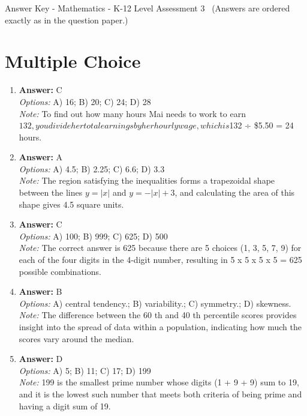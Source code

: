 \documentclass[12pt]{article}
\begin{document}
\begin{center}
Answer Key - Mathematics - K-12 Level Assessment 3 \
\small (Answers are ordered exactly as in the question paper.)
\end{center}

\section*{Multiple Choice}
\begin{enumerate}[label=\arabic*.]
\item \textbf{Answer:} C
\\ \textit{Options:} A) 16; B) 20; C) 24; D) 28
\\ \textit{Note:} To find out how many hours Mai needs to work to earn $132, you divide her total earnings by her hourly wage, which is $132 ÷ \$5.50 = 24 hours.
\item \textbf{Answer:} A
\\ \textit{Options:} A) 4.5; B) 2.25; C) 6.6; D) 3.3
\\ \textit{Note:} The region satisfying the inequalities forms a trapezoidal shape between the lines \(y = |x|\) and \(y = -|x| + 3\), and calculating the area of this shape gives 4.5 square units.
\item \textbf{Answer:} C
\\ \textit{Options:} A) 100; B) 999; C) 625; D) 500
\\ \textit{Note:} The correct answer is 625 because there are 5 choices (1, 3, 5, 7, 9) for each of the four digits in the 4-digit number, resulting in 5 x 5 x 5 x 5 = 625 possible combinations.
\item \textbf{Answer:} B
\\ \textit{Options:} A) central tendency.; B) variability.; C) symmetry.; D) skewness.
\\ \textit{Note:} The difference between the 60 th and 40 th percentile scores provides insight into the spread of data within a population, indicating how much the scores vary around the median.
\item \textbf{Answer:} D
\\ \textit{Options:} A) 5; B) 11; C) 17; D) 199
\\ \textit{Note:} 199 is the smallest prime number whose digits (1 + 9 + 9) sum to 19, and it is the lowest such number that meets both criteria of being prime and having a digit sum of 19.
\end{enumerate}
\end{document}
